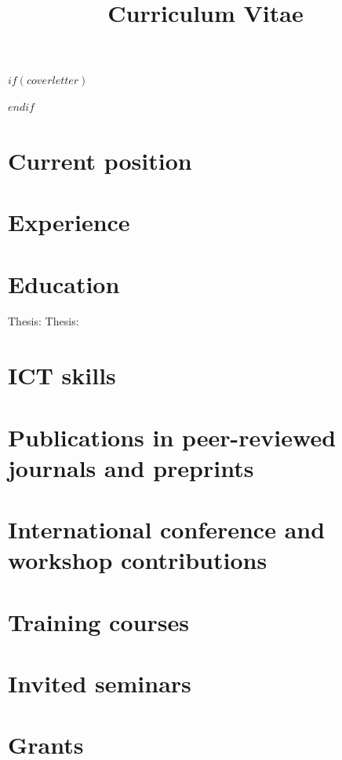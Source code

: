 \documentclass[10pt,a4paper,sans]{moderncv}
\title{Curriculum Vitae}
\begin{document}
    $if(coverletter)$
    
    \clearpage
    $endif$

    \makecvtitle

    \section{Current position}
    \section{Experience}
    \section{Education}
            {}
            {Thesis:} 
            {Thesis:}
    \section{ICT skills}
    \section{Publications in peer-reviewed journals and preprints}
    \section{International conference and workshop contributions}
    \section{Training courses}
    \section{Invited seminars}
    \section{Grants}
\end{document}
